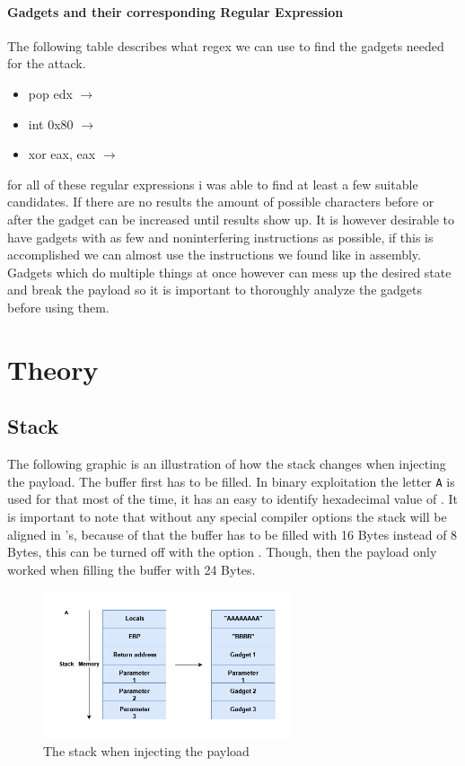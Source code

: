 \documentclass[journal=tosc,submission, notanonymous]{iacrtrans}
\begin{document}
\paragraph{Gadgets and their corresponding Regular Expression}
The following table describes what regex we can use to find the gadgets needed for the attack.
\begin{itemize}
\item pop edx  $\rightarrow$ 
\item int 0x80  $\rightarrow$  
\item xor eax, eax  $\rightarrow$  
\end{itemize}
for all of these regular expressions i was able to find at least a few suitable candidates. If there are no results the amount of possible characters before or after the gadget can be increased until results show up. It is however desirable to have gadgets with as few and noninterfering instructions as possible, if this is accomplished we can almost use the instructions we found like in assembly. Gadgets which do multiple things at once however can mess up the desired state and break the payload so it is important to thoroughly analyze the gadgets before using them.

\section{Theory}
\subsection{Stack}
The following graphic is an illustration of how the stack changes when injecting the payload. The buffer first has to be filled. In binary exploitation the letter \Verb+A+ is used for that most of the time, it has an easy to identify hexadecimal value of . It is important to note that without any special compiler options the stack will be aligned in 's, because of that the buffer has to be filled with 16 Bytes instead of 8 Bytes, this can be turned off with the option . Though, then the payload only worked when filling the buffer with 24 Bytes.
\begin{figure}[h]
  \centering
  \includegraphics[width=0.65\textwidth]{stackropoffsec.png}
  \caption{The stack when injecting the payload}
  \label{fig:mesh1}
\end{figure}
\end{document}
